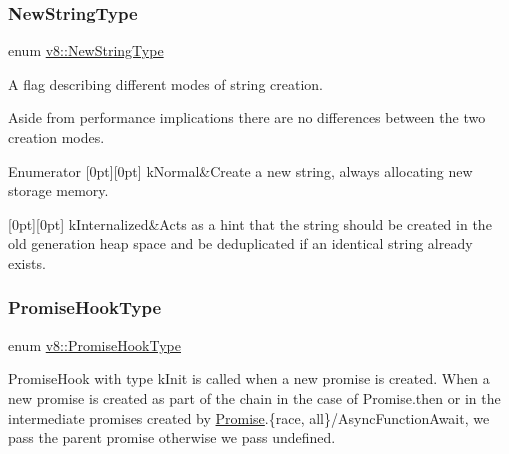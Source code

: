 \subsubsection{\texorpdfstring{New\+String\+Type}{NewStringType}}
{\footnotesize\ttfamily enum \mbox{\hyperlink{namespacev8_ac9163ab12fb3b2a95907a3a0367c6095}{v8\+::\+New\+String\+Type}}\hspace{0.3cm}{\ttfamily [strong]}}

A flag describing different modes of string creation.

Aside from performance implications there are no differences between the two creation modes. \begin{DoxyEnumFields}{Enumerator}
[0pt][0pt]{}\mbox{\label{namespacev8_ac9163ab12fb3b2a95907a3a0367c6095a07fa7a19aa722c635a15e94cb7f50416}} 
k\+Normal&Create a new string, always allocating new storage memory. \\
\hline

[0pt][0pt]{}\mbox{\label{namespacev8_ac9163ab12fb3b2a95907a3a0367c6095ade6a7f11cd845d59e52b388d18929295}} 
k\+Internalized&Acts as a hint that the string should be created in the old generation heap space and be deduplicated if an identical string already exists. \\
\hline

\end{DoxyEnumFields}
\mbox{\label{namespacev8_afe9d9e16c02074ac8482a8f09e19d5cc}} 
\subsubsection{\texorpdfstring{Promise\+Hook\+Type}{PromiseHookType}}
{\footnotesize\ttfamily enum \mbox{\hyperlink{namespacev8_afe9d9e16c02074ac8482a8f09e19d5cc}{v8\+::\+Promise\+Hook\+Type}}\hspace{0.3cm}{\ttfamily [strong]}}

Promise\+Hook with type k\+Init is called when a new promise is created. When a new promise is created as part of the chain in the case of Promise.\+then or in the intermediate promises created by \mbox{\hyperlink{classv8_1_1Promise}{Promise}}.\{race, all\}/\+Async\+Function\+Await, we pass the parent promise otherwise we pass undefined.

